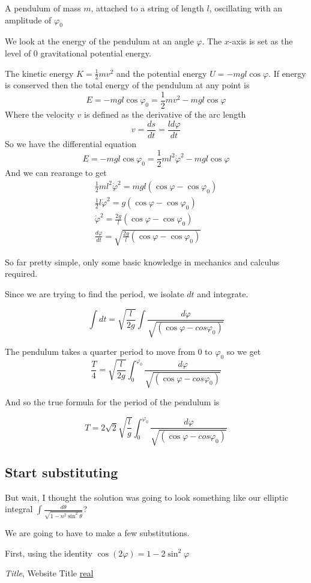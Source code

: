 \documentclass[11pt]{article}
\begin{document}
A pendulum of mass $m$, attached to a string of length $l$, oscillating with an amplitude of $\varphi_0$

\vspace{5mm} We look at the energy of the pendulum at an angle $\varphi$. The $x$-axis is set as the level of $0$ gravitational potential energy. 

\vspace{5mm}The kinetic energy $K=\frac{1}{2}mv^2$ and the potential energy $U=-mgl\cos\varphi$. If energy is conserved then the total energy of the pendulum at any point is
$$E=-mgl\cos\varphi_0=\frac{1}{2}mv^2-mgl\cos\varphi$$
Where the velocity $v$ is defined as the derivative of the arc length 
$$v=\frac{ds}{dt}=\frac{ld\varphi}{dt}$$
So we have the differential equation
$$E=-mgl\cos\varphi_0=\frac{1}{2}ml^2\dot\varphi^2-mgl\cos\varphi$$
And we can rearange to get
\begin{gather*}
\frac{1}{2}ml^2\dot\varphi^2=mgl(\cos\varphi-\cos\varphi_0) \\
\frac{1}{2}l\dot\varphi^2=g(\cos\varphi-\cos\varphi_0) \\
\dot\varphi^2=\frac{2g}{l}(\cos\varphi-\cos\varphi_0) \\
\frac{d\varphi}{dt}=\sqrt{\frac{2g}{l}(\cos\varphi-\cos\varphi_0)}
\end{gather*}

So far pretty simple, only some basic knowledge in mechanics and calculus required.

\vspace{5mm} Since we are trying to find the period, we isolate $dt$ and integrate.

$$\int dt=\sqrt{\frac{l}{2g}}\int\frac{d\varphi}{\sqrt{(\cos\varphi-cos\varphi_0)}}$$

The pendulum takes a quarter period to move from $0$ to $\varphi_0$ so we get
$$\frac{T}{4}=\sqrt{\frac{l}{2g}}\int_0^{\varphi_0}\frac{d\varphi}{\sqrt{(\cos\varphi-cos\varphi_0)}}$$

And so the true formula for the period of the pendulum is 

$$T=2\sqrt{2}\sqrt{\frac{l}{g}}\int_0^{\varphi_0}\frac{d\varphi}{\sqrt{(\cos\varphi-cos\varphi_0)}}$$

\subsection{Start substituting}

But wait, I thought the solution was going to look something like our elliptic integral
$\int\frac{d\theta}{\sqrt{1-n^2\sin^2\theta}}$?

\vspace{5mm} We are going to have to make a few substitutions.

First, using the identity $\cos(2\varphi)=1-2\sin^2\varphi$

\begin{thebibliography}{9}

\emph{Title}, Website Title
\url{real}

\end{thebibliography}
\end{document}
